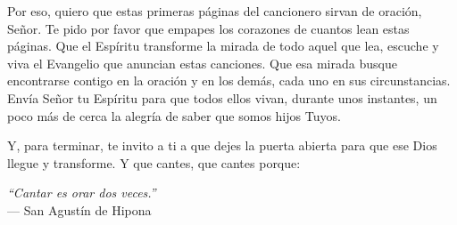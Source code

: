 Por eso, quiero que estas primeras páginas del cancionero sirvan de oración, Señor. Te pido por favor que empapes los corazones de cuantos lean estas páginas. Que el Espíritu transforme la mirada de todo aquel que lea, escuche y viva el Evangelio que anuncian estas canciones. Que esa mirada busque encontrarse contigo en la oración y en los demás, cada uno en sus circunstancias. Envía Señor tu Espíritu para que todos ellos vivan, durante unos instantes, un poco más de cerca la alegría de saber que somos hijos Tuyos.

Y, para terminar, te invito a ti a que dejes la puerta abierta para que ese Dios llegue y transforme. Y que cantes, que cantes porque:
\begin{center}
    \textit{``Cantar es orar dos veces.''}\\
    --- San Agustín de Hipona
\end{center}